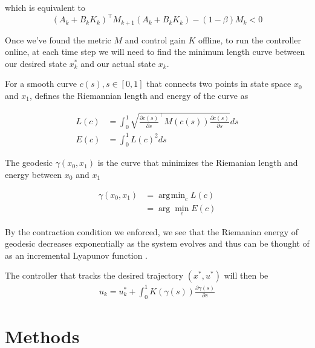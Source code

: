 \documentclass[journal]{IEEEtran}
\DeclareMathOperator*{\argmin}{\arg\!\min}
\begin{document}
which is equivalent to
\begin{equation}
	\label{eq:contraction_condition}
	(A_k + B_k K_k)^\top M_{k+1} (A_k + B_k K_k) - (1 - \beta) M_k < 0
\end{equation}

Once we've found the metric $M$ and control gain $K$ offline, to run the controller online, at each time step we will need to find the minimum length curve between our desired state $x^*_k$ and our actual state $x_k$.

For a smooth curve $c(s), s\in [0, 1]$ that connects two points in state space $x_0$ and $x_1$, \autocite{manchesterControlContractionMetrics2017} defines the Riemannian length and energy of the curve as

\begin{equation}
	\begin{aligned}
		L(c) &= \int_0^1 \sqrt{\frac{\partial{c(s)}}{\partial{s}} ^\top M(c(s)) \frac{\partial{c(s)}}{\partial{s}}} ds \\
		E(c) &= \int_0^1 L(c)^2 ds
	\end{aligned}
	\label{eq:geodesic_length_energy}
\end{equation}

The geodesic $\gamma(x_0, x_1)$ is the curve that minimizes the Riemanian length and energy between $x_0$ and $x_1$

\begin{equation}
	\begin{aligned}
		\gamma(x_0, x_1) &= \argmin_{c} L(c) \\
		&= \arg \min_{c} E(c)
	\end{aligned}
	\label{eq:geodesic}
\end{equation}

By the contraction condition we enforced, we see that the Riemanian energy of geodesic decreases exponentially as the system evolves and thus can be thought of as an incremental Lyapunov function \autocite{manchesterControlContractionMetrics2017}.

The controller that tracks the desired trajectory $(x^*, u^*)$ will then be
\begin{equation}
	\begin{aligned}
		u_k = u^*_k + \int_0^1 K(\gamma(s))\frac{\partial{\gamma(s)}}{\partial{s}}
	\end{aligned}
	\label{eq:control_integral_geodesic}
\end{equation}

\section{Methods}
\end{document}
